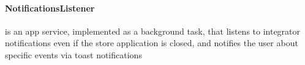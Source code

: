         \paragraph{NotificationsListener} is an app service, implemented as a background task, that listens to integrator notifications even if the store application
        is closed, and notifies the user about specific events via toast notifications

    
